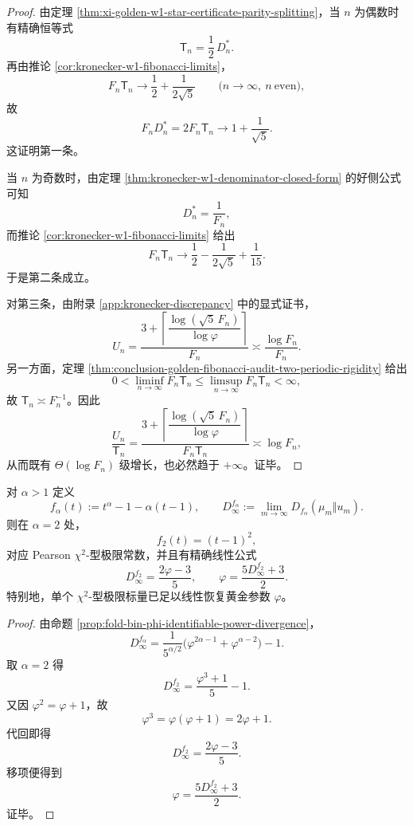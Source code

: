 \begin{proof}
由定理 \ref{thm:xi-golden-w1-star-certificate-parity-splitting}，当 \(n\) 为偶数时有精确恒等式
\[
\mathsf T_n=\frac12\,D_n^\ast.
\]
再由推论 \ref{cor:kronecker-w1-fibonacci-limits}，
\[
F_n\mathsf T_n\longrightarrow \frac12+\frac{1}{2\sqrt5}
\qquad
\bigl(n\to\infty,\ n\ \mathrm{even}\bigr),
\]
故
\[
F_nD_n^\ast=2F_n\mathsf T_n\longrightarrow 1+\frac{1}{\sqrt5}.
\]
这证明第一条。

当 \(n\) 为奇数时，由定理 \ref{thm:kronecker-w1-denominator-closed-form} 的好侧公式可知
\[
D_n^\ast=\frac1{F_n},
\]
而推论 \ref{cor:kronecker-w1-fibonacci-limits} 给出
\[
F_n\mathsf T_n\longrightarrow \frac12-\frac{1}{2\sqrt5}+\frac1{15}.
\]
于是第二条成立。

对第三条，由附录 \ref{app:kronecker-discrepancy} 中的显式证书，
\[
U_n=\frac{3+\left\lceil \dfrac{\log(\sqrt5\,F_n)}{\log\varphi}\right\rceil}{F_n}
\asymp \frac{\log F_n}{F_n}.
\]
另一方面，定理 \ref{thm:conclusion-golden-fibonacci-audit-two-periodic-rigidity} 给出
\[
0<\liminf_{n\to\infty}F_n\mathsf T_n
\le
\limsup_{n\to\infty}F_n\mathsf T_n
<\infty,
\]
故 \(\mathsf T_n\asymp F_n^{-1}\)。因此
\[
\frac{U_n}{\mathsf T_n}
=
\frac{3+\left\lceil \dfrac{\log(\sqrt5\,F_n)}{\log\varphi}\right\rceil}{F_n\mathsf T_n}
\asymp
\log F_n,
\]
从而既有 \(\Theta(\log F_n)\) 级增长，也必然趋于 \(+\infty\)。证毕。
\end{proof}

\begin{theorem}\label{thm:conclusion-chi2-linear-recovers-phi}
对 \(\alpha>1\) 定义
\[
f_\alpha(t):=t^\alpha-1-\alpha(t-1),
\qquad
D_\infty^{f_\alpha}:=\lim_{m\to\infty}D_{f_\alpha}(\mu_m\Vert u_m).
\]
则在 \(\alpha=2\) 处，
\[
f_2(t)=(t-1)^2,
\]
对应 Pearson \(\chi^2\)-型极限常数，并且有精确线性公式
\[
\boxed{\;
D_\infty^{f_2}
=
\frac{2\varphi-3}{5},
\qquad
\varphi=\frac{5D_\infty^{f_2}+3}{2}.\;}
\]
特别地，单个 \(\chi^2\)-型极限标量已足以线性恢复黄金参数 \(\varphi\)。
\end{theorem}
\begin{proof}
由命题 \ref{prop:fold-bin-phi-identifiable-power-divergence}，
\[
D_\infty^{f_\alpha}
=
\frac{1}{5^{\alpha/2}}\bigl(\varphi^{2\alpha-1}+\varphi^{\alpha-2}\bigr)-1.
\]
取 \(\alpha=2\) 得
\[
D_\infty^{f_2}
=
\frac{\varphi^3+1}{5}-1.
\]
又因 \(\varphi^2=\varphi+1\)，故
\[
\varphi^3=\varphi(\varphi+1)=2\varphi+1.
\]
代回即得
\[
D_\infty^{f_2}
=
\frac{2\varphi-3}{5}.
\]
移项便得到
\[
\varphi=\frac{5D_\infty^{f_2}+3}{2}.
\]
证毕。
\end{proof}

